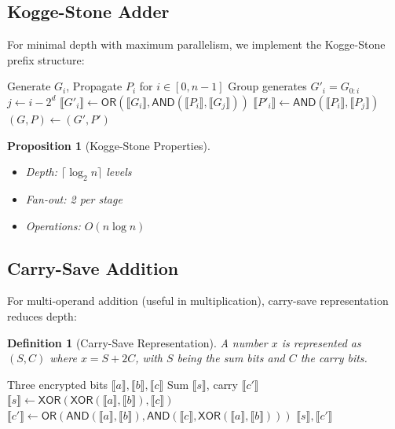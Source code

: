 \documentclass[11pt,a4paper]{article}
\newtheorem{proposition}[theorem]{Proposition}
\newtheorem{definition}[theorem]{Definition}
\begin{document}
\subsection{Kogge-Stone Adder}

For minimal depth with maximum parallelism, we implement the Kogge-Stone prefix structure:

\begin{algorithm}
\caption{Kogge-Stone Prefix Tree}
\begin{algorithmic}[1]
\Require Generate $G_i$, Propagate $P_i$ for $i \in [0, n-1]$
\Ensure Group generates $G'_i = G_{0:i}$
        \State $j \gets i - 2^d$
        \State $\llbracket G'_i \rrbracket \gets \textsf{OR}(\llbracket G_i \rrbracket, \textsf{AND}(\llbracket P_i \rrbracket, \llbracket G_j \rrbracket))$
        \State $\llbracket P'_i \rrbracket \gets \textsf{AND}(\llbracket P_i \rrbracket, \llbracket P_j \rrbracket)$
    \EndFor
    \State $(G, P) \gets (G', P')$
\EndFor
\end{algorithmic}
\end{algorithm}

\begin{proposition}[Kogge-Stone Properties]
\begin{itemize}
    \item Depth: $\lceil \log_2 n \rceil$ levels
    \item Fan-out: 2 per stage
    \item Operations: $O(n \log n)$
\end{itemize}
\end{proposition}

\subsection{Carry-Save Addition}

For multi-operand addition (useful in multiplication), carry-save representation reduces depth:

\begin{definition}[Carry-Save Representation]
A number $x$ is represented as $(S, C)$ where $x = S + 2C$, with $S$ being the sum bits and $C$ the carry bits.
\end{definition}

\begin{algorithm}
\caption{3:2 Compressor (Full Adder)}
\begin{algorithmic}[1]
\Require Three encrypted bits $\llbracket a \rrbracket, \llbracket b \rrbracket, \llbracket c \rrbracket$
\Ensure Sum $\llbracket s \rrbracket$, carry $\llbracket c' \rrbracket$
\State $\llbracket s \rrbracket \gets \textsf{XOR}(\textsf{XOR}(\llbracket a \rrbracket, \llbracket b \rrbracket), \llbracket c \rrbracket)$
\State $\llbracket c' \rrbracket \gets \textsf{OR}(\textsf{AND}(\llbracket a \rrbracket, \llbracket b \rrbracket), \textsf{AND}(\llbracket c \rrbracket, \textsf{XOR}(\llbracket a \rrbracket, \llbracket b \rrbracket)))$
\State \Return $\llbracket s \rrbracket, \llbracket c' \rrbracket$
\end{algorithmic}
\end{algorithm}
\end{document}
